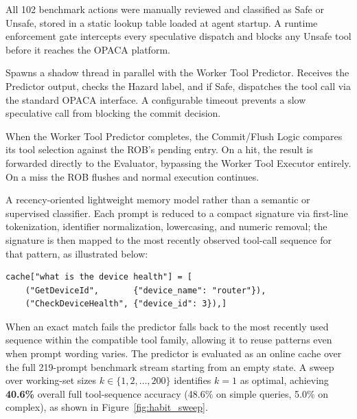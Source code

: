 \documentclass[conference]{IEEEtran}
\begin{document}
\begin{description}[leftmargin=0pt, itemsep=3pt, topsep=4pt]
  \item[\textbf{Hazard Detection Unit.}]
  All 102 benchmark actions were manually reviewed and classified as Safe or
  Unsafe, stored in a static lookup table loaded at agent startup.
  A runtime enforcement gate intercepts every speculative dispatch and blocks
  any Unsafe tool before it reaches the OPACA platform.

  \item[\textbf{Speculative Execution Engine.}]
  Spawns a shadow thread in parallel with the Worker Tool Predictor.
  Receives the Predictor output, checks the Hazard label, and if Safe, dispatches
  the tool call via the standard OPACA interface.
  A configurable timeout prevents a slow speculative call from blocking the
  commit decision.

  \item[\textbf{Reorder Buffer.}]
  When the Worker Tool Predictor completes, the Commit/Flush Logic compares its
  tool selection against the ROB's pending entry.
  On a hit, the result is forwarded directly to the Evaluator, bypassing the
  Worker Tool Executor entirely.
  On a miss the ROB flushes and normal execution continues.

  \item[\textbf{Habit-Based Predictor.}]
  A recency-oriented lightweight memory model rather than a semantic or
  supervised classifier.
  Each prompt is reduced to a compact signature via first-line tokenization,
  identifier normalization, lowercasing, and numeric removal; the signature is
  then mapped to the most recently observed tool-call sequence for that pattern,
  as illustrated below:
\begin{lstlisting}
cache["what is the device health"] = [
    ("GetDeviceId",       {"device_name": "router"}),
    ("CheckDeviceHealth", {"device_id": 3}),]
\end{lstlisting}
  When an exact match fails the predictor falls back to the most recently used
  sequence within the compatible tool family, allowing it to reuse patterns even
  when prompt wording varies.
  The predictor is evaluated as an online cache over the full 219-prompt
  benchmark stream starting from an empty state.
  A sweep over working-set sizes $k \in \{1, 2, \ldots, 200\}$ identifies
  $k{=}1$ as optimal, achieving \textbf{40.6\%} overall full tool-sequence
  accuracy (48.6\% on simple queries, 5.0\% on complex), as shown in
  Figure~\ref{fig:habit_sweep}.


\end{description}
\end{document}
